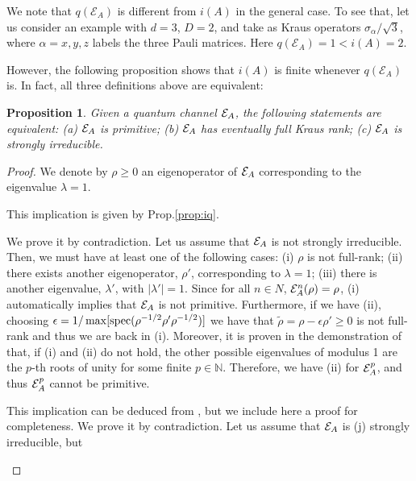 \documentclass[journal,twoside]{IEEEtran}
\newtheorem{proposition}{Proposition}
\newcommand{\1}{\mathbbm{1}}
\def\E{{\cal E}}
\renewcommand{\>}{\rangle}
\newcommand{\<}{\langle}
\def\E{\mathcal{E}}
\def\N{\mathbb N}
\begin{document}
We note that $q(\E_A)$ is different from $i(A)$ in the general case.
To see that, let us consider an example with $d=3$, $D=2$, and take
as Kraus operators $\sigma_\alpha/\sqrt{3}$, where $\alpha=x,y,z$
labels the three Pauli matrices. Here $q(\E_A) = 1 < i(A) = 2$.

However, the following proposition shows that $i(A)$ is finite
whenever $q(\E_A)$ is. In fact, all three definitions above are
equivalent:
\begin{proposition}\label{prop:equiv}
Given a quantum channel ${\cal E}_A$, the following statements are
equivalent: (a) ${\cal E}_A$ is primitive; (b) ${\cal E}_A$ has
eventually full Kraus rank; (c) ${\cal E}_A$ is strongly
irreducible.
\end{proposition}

\begin{proof}
We denote by $\rho\ge 0$ an eigenoperator of ${\cal E}_A$
corresponding to the eigenvalue $\lambda=1$.
\begin{trivlist}
\setlength\leftmargin {0em}
  \item[(b) $\Rightarrow$ (a)] \mbox{}\par
This implication is given by Prop.\ref{prop:iq}.
  \item[(a) $\Rightarrow$ (c)] \mbox{}\par
We prove it by contradiction. Let us assume that ${\cal E}_A$ is not
strongly irreducible. Then, we must have at least one of the
following cases: (i) $\rho$ is not full-rank; (ii) there exists
another eigenoperator, $\rho'$, corresponding to $\lambda=1$; (iii)
there is another eigenvalue, $\lambda'$, with $|\lambda'|=1$. Since
for all $n\in N$, ${\cal E}_A^n(\rho)=\rho$, (i) automatically
implies that ${\cal E}_A$ is not primitive. Furthermore, if we have
(ii),  choosing $\epsilon=1/\max[{\rm spec}(\rho^{-1/2}{\rho'}\rho^{-1/2})]$ we have that $\tilde
\rho=\rho-\epsilon \rho'\ge 0$ is not full-rank and thus we are back
in (i). Moreover, it is proven in the demonstration of
\cite[Proposition 3.3]{FNW92} that, if (i) and (ii) do not hold, the
other possible eigenvalues of modulus 1 are the $p$-th roots of
unity for some finite $p\in \N$. Therefore, we have (ii) for ${\cal
E}_A^p$, and thus ${\cal E}_A^p$ cannot be primitive.
  \item[(c) $\Rightarrow$ (b)] \mbox{}\par
This implication can be deduced from \cite[Lemma 5.2]{FNW92}, but we
include here a proof for completeness. We prove it by contradiction.
Let us assume that ${\cal E}_A$ is (j) strongly irreducible, but

\end{trivlist}
\end{proof}
\end{document}
